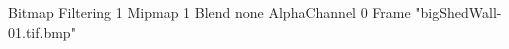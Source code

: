 {Bitmap
	{Filtering 1}
	{Mipmap 1}
	{Blend none}
	{AlphaChannel 0}
	{Frame "bigShedWall-01.tif.bmp"}
}
